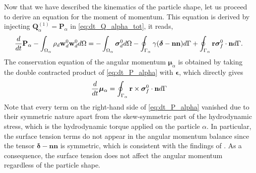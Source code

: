 Now that we have described the kinematics   of the particle shape, let us proceed to derive an equation for the moment of momentum.
This equation is derived by injecting $\textbf{Q}_\alpha^{(1)} = \textbf{P}_\alpha$ in \ref{eq:dt_Q_alpha_tot}, it reads, 
\begin{equation}
    \ddt {\textbf{P}_\alpha}
    - \intO{ \rho_d  \textbf{w}_d^0 \textbf{w}_d^0 }
    = 
    - \intO{\bm{\sigma}_d^0}
    - \intS{ 
        \gamma (\bm\delta - \textbf{nn})
    }
    + \intS{ \textbf{r}\bm{\sigma}_f^0\cdot \textbf{n}}.
    \label{eq:dt_P_alpha}
\end{equation}
The conservation equation of the angular momentum $\bm{\mu}_\alpha$ is obtained by taking the double contracted product of \ref{eq:dt_P_alpha} with $\bm\epsilon$, which directly gives
\begin{equation}
    \ddt\bm{\mu}_\alpha
    =  
    \intS{ \textbf{r} \times \bm{\sigma}_f^0\cdot \textbf{n} }
    \label{eq:dt_mu_alpha}
\end{equation}
Note that every term on the right-hand side of \ref{eq:dt_P_alpha} vanished due to their symmetric nature apart from the skew-symmetric part of the hydrodynamic stress, which is the hydrodynamic torque applied on the particle $\alpha$.
In particular, the surface tension terms do not appear in the angular momentum balance since the tensor $\bm\delta-\textbf{nn}$ is symmetric, which is consistent with the findings of \citet{hesla1993note}. 
As a consequence, the surface tension does not affect the angular momentum regardless of the particle shape. 

